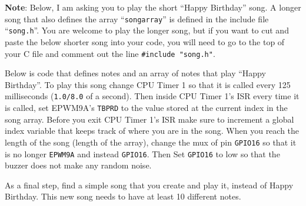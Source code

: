 \documentclass[11pt]{article}
\begin{document}
\textbf{Note}:  Below, I am asking you to play the short “Happy Birthday” song. A longer song that also defines the array “\texttt{songarray}” is defined in the include file “\texttt{song.h}”. You are welcome to play the longer song, but if you want to cut and paste the below shorter song into your code, you will need to go to the top of your C file and comment out the line \texttt{#include "song.h"}.

Below is code that defines notes and an array of notes that play “Happy Birthday”.  To play this song change CPU Timer 1 so that it is called every 125 milliseconds (\texttt{1.0/8.0} of a second).  Then inside CPU Timer 1’s ISR every time it is called, set EPWM9A’s \texttt{TBPRD} to the value stored at the current index in the song array.  Before you exit CPU Timer 1’s ISR make sure to increment a global index variable that keeps track of where you are in the song.  When you reach the length of the song (length of the array), change the mux of pin \texttt{GPIO16} so that it is no longer \texttt{EPWM9A} and instead \texttt{GPIO16}.  Then Set \texttt{GPIO16} to low so that the buzzer does not make any random noise.

As a final step, find a simple song that you create and play it, instead of Happy Birthday. This new song needs to have at least 10 different notes.
\end{document}
